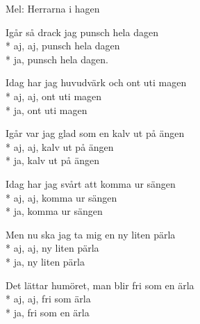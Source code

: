 \begin{SongText}[Botvisa]
\begin{SongInfo}
    Mel: Herrarna i hagen
\end{SongInfo}
\begin{SongVerse}
Igår så drack jag punsch hela dagen\\*%
aj, aj, punsch hela dagen\\*%
ja, punsch hela dagen.
\end{SongVerse}
\begin{SongVerse}
Idag har jag huvudvärk och ont uti magen\\*%
aj, aj, ont uti magen\\*%
ja, ont uti magen
\end{SongVerse}
\begin{SongVerse}
Igår var jag glad som en kalv ut på ängen\\*%
aj, aj, kalv ut på ängen\\*%
ja, kalv ut på ängen
\end{SongVerse}
\begin{SongVerse}
Idag har jag svårt att komma ur sängen\\*%
aj, aj, komma ur sängen\\*%
ja, komma ur sängen
\end{SongVerse}
\begin{SongVerse}
Men nu ska jag ta mig en ny liten pärla\\*%
aj, aj, ny liten pärla\\*%
ja, ny liten pärla
\end{SongVerse}
\begin{SongVerse}
Det lättar humöret, man blir fri som en ärla\\*%
aj, aj, fri som ärla\\*%
ja, fri som en ärla
\end{SongVerse}
\end{SongText}
